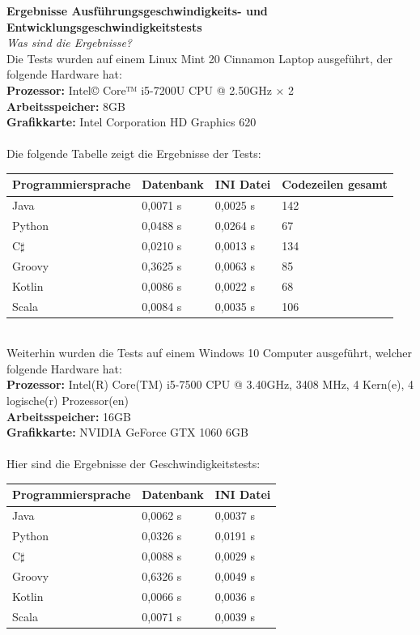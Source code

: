 \documentclass[ngerman]{article}
\begin{document}
    \textbf{Ergebnisse Ausführungsgeschwindigkeits- und Entwicklungsgeschwindigkeitstests}\\
    \textit{Was sind die Ergebnisse?}\\
    Die Tests wurden auf einem Linux Mint 20 Cinnamon Laptop ausgeführt, der folgende Hardware hat:\\
    \textbf{Prozessor:} Intel© Core™ i5-7200U CPU @ 2.50GHz × 2\\
    \textbf{Arbeitsspeicher:} 8GB\\
    \textbf{Grafikkarte:} Intel Corporation HD Graphics 620\\\\
    Die folgende Tabelle zeigt die Ergebnisse der Tests:\\
    \begin{tabular}{|l|l|l|l|}
        \hline
        \textbf{Programmiersprache}&\textbf{Datenbank}&\textbf{INI Datei}&\textbf{Codezeilen gesamt}\\
        \hline
        Java&0,0071 s&0,0025 s&142\\
        \hline
        Python&0,0488 s&0,0264 s&67\\
        \hline
        C$\sharp$&0,0210 s&0,0013 s&134\\
        \hline
        Groovy&0,3625 s&0,0063 s&85\\
        \hline
        Kotlin&0,0086 s&0,0022 s&68\\
        \hline
        Scala&0,0084 s&0,0035 s&106\\
        \hline
    \end{tabular}\\
    Weiterhin wurden die Tests auf einem Windows 10 Computer ausgeführt, welcher folgende Hardware hat:\\
    \textbf{Prozessor:} Intel(R) Core(TM) i5-7500 CPU @ 3.40GHz, 3408 MHz, 4 Kern(e), 4 logische(r) Prozessor(en)\\
    \textbf{Arbeitsspeicher:} 16GB\\
    \textbf{Grafikkarte:} NVIDIA GeForce GTX 1060 6GB\\\\
    Hier sind die Ergebnisse der Geschwindigkeitstests:\\
    \begin{tabular}{|l|l|l|}
        \hline
        \textbf{Programmiersprache}&\textbf{Datenbank}&\textbf{INI Datei}\\
        \hline
        Java&0,0062 s&0,0037 s\\
        \hline
        Python&0,0326 s&0,0191 s\\
        \hline
        C$\sharp$&0,0088 s&0,0029 s\\
        \hline
        Groovy&0,6326 s&0,0049 s\\
        \hline
        Kotlin&0,0066 s&0,0036 s\\
        \hline
        Scala&0,0071 s&0,0039 s\\
        \hline
    \end{tabular}\\
\end{document}

